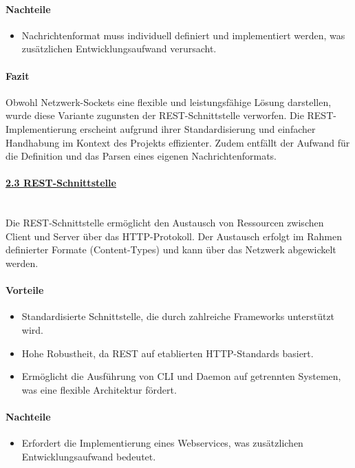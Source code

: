 \documentclass[a4paper,12pt]{report}
\begin{document}
    \paragraph*{Nachteile}
    \begin{itemize}
        \item Nachrichtenformat muss individuell definiert und implementiert werden, was zusätzlichen Entwicklungsaufwand verursacht.
    \end{itemize}

    \paragraph*{Fazit}
    Obwohl Netzwerk-Sockets eine flexible und leistungsfähige Lösung darstellen, wurde diese Variante zugunsten der REST-Schnittstelle verworfen.
    Die REST-Implementierung erscheint aufgrund ihrer Standardisierung und einfacher Handhabung im Kontext des Projekts effizienter.
    Zudem entfällt der Aufwand für die Definition und das Parsen eines eigenen Nachrichtenformats.

    \paragraph*{\underline{2.3 REST-Schnittstelle}}\mbox{}\\
    Die REST-Schnittstelle ermöglicht den Austausch von Ressourcen zwischen Client und Server über das HTTP-Protokoll.
    Der Austausch erfolgt im Rahmen definierter Formate (Content-Types) und kann über das Netzwerk abgewickelt werden.

    \paragraph*{Vorteile}
    \begin{itemize}
        \item Standardisierte Schnittstelle, die durch zahlreiche Frameworks unterstützt wird.
        \item Hohe Robustheit, da REST auf etablierten HTTP-Standards basiert.
        \item Ermöglicht die Ausführung von CLI und Daemon auf getrennten Systemen, was eine flexible Architektur fördert.
    \end{itemize}

    \paragraph*{Nachteile}
    \begin{itemize}
        \item Erfordert die Implementierung eines Webservices, was zusätzlichen Entwicklungsaufwand bedeutet.
    \end{itemize}
\end{document}
